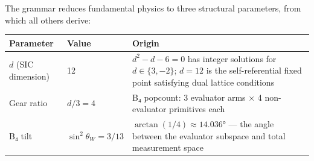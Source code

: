\documentclass[12pt,a4paper]{article}
\begin{document}
The grammar reduces fundamental physics to three structural parameters,
from which all others derive:

\begin{longtable}[]{@{}lll@{}}
\toprule
\begin{minipage}[b]{0.39\columnwidth}\raggedright
Parameter\strut
\end{minipage} & \begin{minipage}[b]{0.25\columnwidth}\raggedright
Value\strut
\end{minipage} & \begin{minipage}[b]{0.28\columnwidth}\raggedright
Origin\strut
\end{minipage}\tabularnewline
\midrule
\endhead
\begin{minipage}[t]{0.39\columnwidth}\raggedright
\(d\) (SIC dimension)\strut
\end{minipage} & \begin{minipage}[t]{0.25\columnwidth}\raggedright
12\strut
\end{minipage} & \begin{minipage}[t]{0.28\columnwidth}\raggedright
\(d^2 - d - 6 = 0\) has integer solutions for \(d \in \{3, -2\}\);
\(d=12\) is the self-referential fixed point satisfying dual lattice
conditions\strut
\end{minipage}\tabularnewline
\begin{minipage}[t]{0.39\columnwidth}\raggedright
Gear ratio\strut
\end{minipage} & \begin{minipage}[t]{0.25\columnwidth}\raggedright
\(d/3 = 4\)\strut
\end{minipage} & \begin{minipage}[t]{0.28\columnwidth}\raggedright
B₄ popcount: 3 evaluator arms × 4 non-evaluator primitives each\strut
\end{minipage}\tabularnewline
\begin{minipage}[t]{0.39\columnwidth}\raggedright
B₄ tilt\strut
\end{minipage} & \begin{minipage}[t]{0.25\columnwidth}\raggedright
\(\sin^2\theta_W = 3/13\)\strut
\end{minipage} & \begin{minipage}[t]{0.28\columnwidth}\raggedright
\(\arctan(1/4) \approx 14.036°\) --- the angle between the evaluator
subspace and total measurement space\strut
\end{minipage}\tabularnewline
\bottomrule
\end{longtable}
\end{document}
